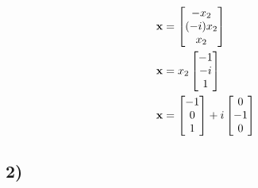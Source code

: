 \documentclass{article}
\begin{document}
\begin{align*}
	\mathbf{x} & = \begin{bmatrix} -x_2 \\ (-i)x_2 \\ x_2 \end{bmatrix} \\
	\mathbf{x} & = x_2 \begin{bmatrix} -1 \\ -i \\ 1 \end{bmatrix} \\
	\mathbf{x} & = \begin{bmatrix} -1 \\ 0 \\ 1 \end{bmatrix} + i\begin{bmatrix} 0 \\ -1 \\ 0 \end{bmatrix}
\end{align*}

\subsection{2)}
\end{document}
